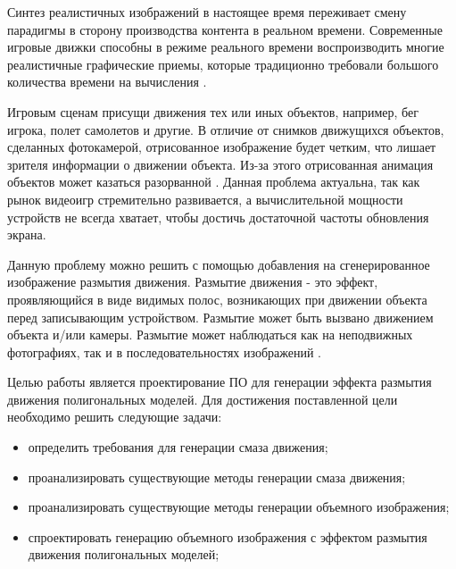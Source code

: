 \Introduction
Синтез реалистичных изображений в настоящее время переживает смену парадигмы в сторону производства контента в реальном времени. Современные игровые движки способны в режиме реального времени воспроизводить многие реалистичные графические приемы, которые традиционно требовали большого количества времени на вычисления \cite{RONNOW202136}.  
\par
Игровым сценам присущи движения тех или иных объектов, например, бег игрока, полет самолетов и другие. В отличие от снимков движущихся объектов, сделанных фотокамерой, отрисованное изображение будет четким, что лишает зрителя информации о движении объекта. Из-за этого отрисованная анимация объектов может казаться разорванной \cite{Navarro11}.   Данная проблема актуальна, так как рынок видеоигр стремительно развивается, а вычислительной мощности устройств не всегда хватает, чтобы достичь достаточной частоты обновления экрана.
\par
Данную проблему можно решить с помощью добавления на сгенерированное изображение размытия движения. Размытие движения - это эффект, проявляющийся в виде видимых полос, возникающих при движении объекта перед записывающим устройством. Размытие может быть вызвано движением объекта и/или камеры.  Размытие может наблюдаться как на неподвижных фотографиях, так и в последовательностях изображений \cite{Navarro11}.  

Целью работы является проектирование ПО для генерации эффекта размытия движения полигональных моделей. Для достижения поставленной цели необходимо решить следующие задачи:

\begin{itemize}
    \item определить требования для генерации смаза движения;
    \item проанализировать существующие методы генерации смаза движения;
    \item проанализировать существующие методы генерации объемного изображения;
    \item спроектировать генерацию объемного изображения с эффектом размытия движения полигональных моделей;
\end{itemize}






